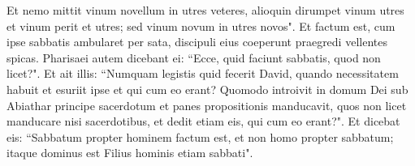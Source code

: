 \begin{biblechapter}
\verse Et nemo mittit vinum novellum in utres veteres, alioquin dirumpet vinum utres et vinum perit et utres; sed vinum novum in utres novos". 
\verse Et factum est, cum ipse sabbatis ambularet per sata, discipuli eius coeperunt praegredi vellentes spicas. 
\verse Pharisaei autem dicebant ei: “Ecce, quid faciunt sabbatis, quod non licet?". 
\verse Et ait illis: “Numquam legistis quid fecerit David, quando necessitatem habuit et esuriit ipse et qui cum eo erant? 
\verse Quomodo introivit in domum Dei sub Abiathar principe sacerdotum et panes propositionis manducavit, quos non licet manducare nisi sacerdotibus, et dedit etiam eis, qui cum eo erant?". 
\verse Et dicebat eis: “Sabbatum propter hominem factum est, et non homo propter sabbatum; 
\verse itaque dominus est Filius hominis etiam sabbati". 
\end{biblechapter}

